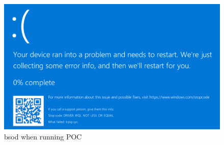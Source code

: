\documentclass{report}
\begin{document}
\begin{figure}[H]
	\centering
    \includegraphics[width=\textwidth]{bsod.png}
    \caption{\gls{bsod} when running \gls{POC}}
    \label{fig:poc:bsod}
\end{figure}
\end{document}
